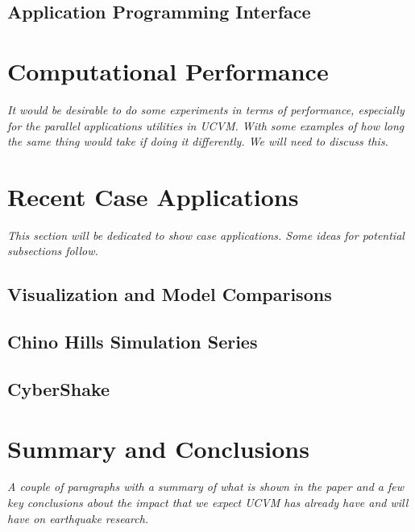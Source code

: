 \subsection{Application Programming Interface}

\section{Computational Performance}
\label{sec:conclusions}

\textit{
\color{blue}
It would be desirable to do some experiments in terms of performance, especially for the parallel applications utilities in UCVM. With some examples of how long the same thing would take if doing it differently. We will need to discuss this.
}

\section{Recent Case Applications}
\label{sec:conclusions}

\textit{
\color{blue}
This section will be dedicated to show case applications. Some ideas for potential subsections follow.
}

\subsection{Visualization and Model Comparisons}

\subsection{Chino Hills Simulation Series}

\subsection{CyberShake}

\section{Summary and Conclusions}
\label{sec:conclusions}

\textit{
\color{blue}
A couple of paragraphs with a summary of what is shown in the paper and a few key conclusions about the impact that we expect UCVM has already have and will have on earthquake research.
}

